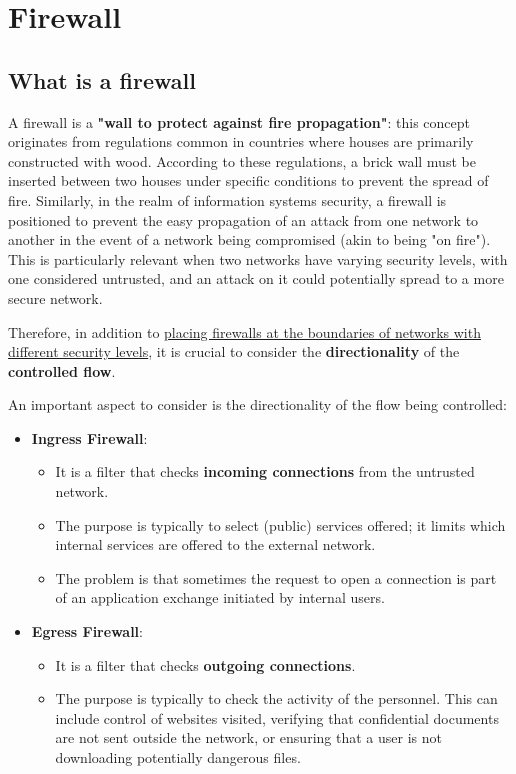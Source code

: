\chapter{Firewall}

\section{What is a firewall}
A firewall is a \textbf{"wall to protect against fire propagation"}: this concept originates from regulations common in countries where houses are primarily constructed with wood. According to these regulations, a brick wall must be inserted between two houses under specific conditions to prevent the spread of fire. Similarly, in the realm of information systems security, a firewall is positioned to prevent the easy propagation of an attack from one network to another in the event of a network being compromised (akin to being "on fire"). This is particularly relevant when two networks have varying security levels, with one considered untrusted, and an attack on it could potentially spread to a more secure network.

Therefore, in addition to \ul{placing firewalls at the boundaries of networks with different security levels}, it is crucial to consider the \textbf{directionality} of the \textbf{controlled flow}.


An important aspect to consider is the directionality of the flow being controlled:
\begin{itemize}
	\item \textbf{Ingress Firewall}:
	      \begin{itemize}
		      \item It is a filter that checks \textbf{incoming connections} from the untrusted network.
		      \item The purpose is typically to select (public) services offered; it limits which internal services are offered to the external network.
		      \item The problem is that sometimes the request to open a connection is part of an application exchange initiated by internal users.
	      \end{itemize}
	\item \textbf{Egress Firewall}:
	      \begin{itemize}
		      \item It is a filter that checks \textbf{outgoing connections}.
		      \item The purpose is typically to check the activity of the personnel. This can include control of websites visited, verifying that confidential documents are not sent outside the network, or ensuring that a user is not downloading potentially dangerous files.
	      \end{itemize}
\end{itemize}



